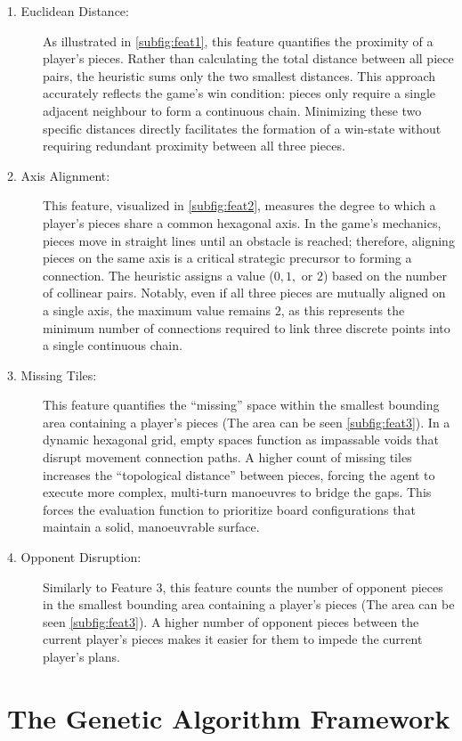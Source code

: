 \begin{description}
  \item[1. Euclidean Distance:] As illustrated in \cref{subfig:feat1}, this feature quantifies the proximity of a player's pieces. Rather than calculating the total distance between all piece pairs, the heuristic sums only the two smallest distances. This approach accurately reflects the game's win condition: pieces only require a single adjacent neighbour to form a continuous chain. Minimizing these two specific distances directly facilitates the formation of a win-state without requiring redundant proximity between all three pieces.
  \item[2. Axis Alignment:]  This feature, visualized in \cref{subfig:feat2}, measures the degree to which a player's pieces share a common hexagonal axis. In the game’s mechanics, pieces move in straight lines until an obstacle is reached; therefore, aligning pieces on the same axis is a critical strategic precursor to forming a connection. The heuristic assigns a value ($0, 1, $ or $2$) based on the number of collinear pairs. Notably, even if all three pieces are mutually aligned on a single axis, the maximum value remains $2$, as this represents the minimum number of connections required to link three discrete points into a single continuous chain.
  \item[3. Missing Tiles:] This feature quantifies the ``missing'' space within the smallest bounding area containing a player's pieces (The area can be seen \cref{subfig:feat3}). In a dynamic hexagonal grid, empty spaces function as impassable voids that disrupt movement connection paths. A higher count of missing tiles increases the ``topological distance'' between pieces, forcing the agent to execute more complex, multi-turn manoeuvres to bridge the gaps. This forces the evaluation function to prioritize board configurations that maintain a solid, manoeuvrable surface.
  \item[4. Opponent Disruption:] Similarly to Feature 3, this feature counts the number of opponent pieces in the smallest bounding area containing a player's pieces (The area can be seen \cref{subfig:feat3}). A higher number of opponent pieces between the current player's pieces makes it easier for them to impede the current player's plans.
\end{description}



\section{The Genetic Algorithm Framework}
\label{sec:ga_framework}

